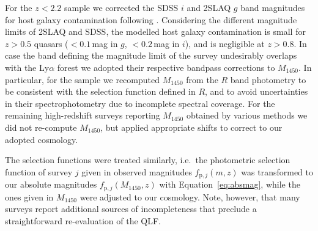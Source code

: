 \documentclass[a4paper,fleqn,usenatbib]{mnras}
\begin{document}
For the $z<2.2$ sample we corrected the SDSS $i$ and 2SLAQ $g$ band
magnitudes for host galaxy contamination following
\citet{2009MNRAS.392...19C}. Considering the different magnitude
limits of 2SLAQ and SDSS, the modelled host galaxy contamination is
small for $z>0.5$ quasars ($<0.1$\,mag in $g$, $<0.2$\,mag in $i$),
and is negligible at $z>0.8$.  In case the band defining the magnitude
limit of the survey undesirably overlaps with the Ly$\alpha$ forest
\citep{2010ApJ...710.1498G, 2011ApJ...728L..26G, 2013ApJ...768..105M}
we adopted their respective bandpass corrections to $M_{1450}$. In
particular, for the \citet{2010ApJ...710.1498G, 2011ApJ...728L..26G}
sample we recomputed $M_{1450}$ from the $R$ band photometry to be
consistent with the selection function defined in $R$, and to avoid
uncertainties in their spectrophotometry due to incomplete spectral
coverage. For the remaining high-redshift surveys reporting $M_{1450}$
obtained by various methods \citep{2010AJ....139..906W,
  2015ApJ...798...28K, 2015AA...578A..83G, 2016ApJ...829...33Y,
  2016ApJ...833..222J} we did not re-compute $M_{1450}$, but applied
appropriate shifts to correct to our adopted cosmology.

The selection functions were treated similarly, i.e.\ the photometric
selection function of survey $j$ given in observed magnitudes
$f_{\mathrm{p},j}\left(m,z\right)$ \citep{2006AJ....131.2766R,
  2009MNRAS.392...19C, 2010ApJ...710.1498G, 2013ApJ...773...14R} was
transformed to our absolute magnitudes
$f_{\mathrm{p},j}\left(M_{1450},z\right)$ with
Equation~\ref{eq:absmag}, while the ones given in $M_{1450}$ were
adjusted to our cosmology. Note, however, that many surveys report
additional sources of incompleteness that preclude a straightforward
re-evaluation of the QLF.
\end{document}
